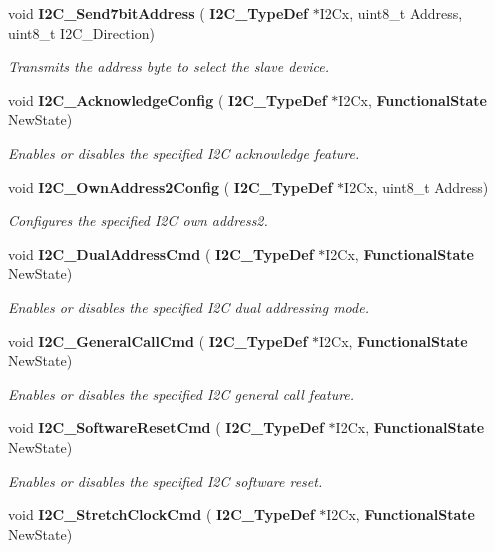 \begin{DoxyCompactItemize}
void \textbf{ I2\+C\+\_\+\+Send7bit\+Address} (\textbf{ I2\+C\+\_\+\+Type\+Def} $\ast$I2\+Cx, uint8\+\_\+t Address, uint8\+\_\+t I2\+C\+\_\+\+Direction)
\begin{DoxyCompactList}\small\item\em Transmits the address byte to select the slave device. \end{DoxyCompactList}\item 
void \textbf{ I2\+C\+\_\+\+Acknowledge\+Config} (\textbf{ I2\+C\+\_\+\+Type\+Def} $\ast$I2\+Cx, \textbf{ Functional\+State} New\+State)
\begin{DoxyCompactList}\small\item\em Enables or disables the specified I2C acknowledge feature. \end{DoxyCompactList}\item 
void \textbf{ I2\+C\+\_\+\+Own\+Address2\+Config} (\textbf{ I2\+C\+\_\+\+Type\+Def} $\ast$I2\+Cx, uint8\+\_\+t Address)
\begin{DoxyCompactList}\small\item\em Configures the specified I2C own address2. \end{DoxyCompactList}\item 
void \textbf{ I2\+C\+\_\+\+Dual\+Address\+Cmd} (\textbf{ I2\+C\+\_\+\+Type\+Def} $\ast$I2\+Cx, \textbf{ Functional\+State} New\+State)
\begin{DoxyCompactList}\small\item\em Enables or disables the specified I2C dual addressing mode. \end{DoxyCompactList}\item 
void \textbf{ I2\+C\+\_\+\+General\+Call\+Cmd} (\textbf{ I2\+C\+\_\+\+Type\+Def} $\ast$I2\+Cx, \textbf{ Functional\+State} New\+State)
\begin{DoxyCompactList}\small\item\em Enables or disables the specified I2C general call feature. \end{DoxyCompactList}\item 
void \textbf{ I2\+C\+\_\+\+Software\+Reset\+Cmd} (\textbf{ I2\+C\+\_\+\+Type\+Def} $\ast$I2\+Cx, \textbf{ Functional\+State} New\+State)
\begin{DoxyCompactList}\small\item\em Enables or disables the specified I2C software reset. \end{DoxyCompactList}\item 
void \textbf{ I2\+C\+\_\+\+Stretch\+Clock\+Cmd} (\textbf{ I2\+C\+\_\+\+Type\+Def} $\ast$I2\+Cx, \textbf{ Functional\+State} New\+State)

\end{DoxyCompactItemize}
